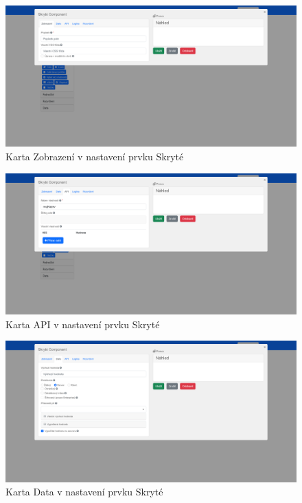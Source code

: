 \begin{figure}[H]
    \includegraphics[width=\textwidth]{../img/screenshots/odvozena-hodnota-nastaveni}
    \caption{Karta Zobrazení v nastavení prvku Skryté}\label{fig:odvozena-hodnota-nastaveni}
\end{figure}

\begin{figure}[H]
    \includegraphics[width=\textwidth]{../img/screenshots/odvozena-hodnota-nastaveni-nazvu}
    \caption{Karta API v nastavení prvku Skryté}\label{fig:odvozena-hodnota-nastaveni-nazev}
\end{figure}

\begin{figure}[H]
    \includegraphics[width=\textwidth]{../img/screenshots/odvozena-hodnota-vzorec-a-server}
    \caption{Karta Data v nastavení prvku Skryté}\label{fig:odvozena-hodnota-vzorec-a-server}
\end{figure}

